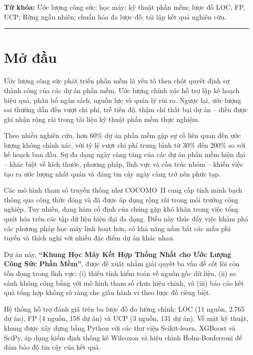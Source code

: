 \documentclass[12pt,a4paper]{article}
\begin{document}
\vspace{6pt}
\noindent\textbf{Từ khóa:} Ước lượng công sức; học máy; kỹ thuật phần mềm; lược đồ LOC, FP, UCP; Rừng ngẫu nhiên; chuẩn hóa đa lược đồ; tái lập kết quả nghiên cứu.

\vspace{4pt}
\hrule
\vspace{10pt}

\section{Mở đầu}

Ước lượng công sức phát triển phần mềm là yếu tố then chốt quyết định sự thành công của các dự án phần mềm. Ước lượng chính xác hỗ trợ lập kế hoạch hiệu quả, phân bổ ngân sách, nguồn lực và quản lý rủi ro. Ngược lại, ước lượng sai thường dẫn đến vượt chi phí, trễ tiến độ, thậm chí thất bại dự án -- điều được ghi nhận rộng rãi trong tài liệu kỹ thuật phần mềm thực nghiệm.

Theo nhiều nghiên cứu, hơn 60\% dự án phần mềm gặp sự cố liên quan đến ước lượng không chính xác, với tỷ lệ vượt chi phí trung bình từ 30\% đến 200\% so với kế hoạch ban đầu. Sự đa dạng ngày càng tăng của các dự án phần mềm hiện đại -- khác biệt về kích thước, phương pháp, lĩnh vực và cấu trúc nhóm -- khiến việc tạo ra ước lượng nhất quán và đáng tin cậy ngày càng trở nên phức tạp.

Các mô hình tham số truyền thống như COCOMO~II cung cấp tính minh bạch thông qua công thức đóng và đã được áp dụng rộng rãi trong môi trường công nghiệp. Tuy nhiên, dạng hàm cố định của chúng gặp khó khăn trong việc tổng quát hóa trên các tập dữ liệu hiện đại đa dạng. Điều này thúc đẩy việc khám phá các phương pháp học máy linh hoạt hơn, có khả năng nắm bắt các mẫu phi tuyến và thích nghi với nhiều đặc điểm dự án khác nhau.

Dự án này, \textbf{``Khung Học Máy Kết Hợp Thống Nhất cho Ước Lượng Công Sức Phần Mềm''}, được đề xuất nhằm giải quyết ba vấn đề cốt lõi còn tồn đọng trong lĩnh vực: (i) thiếu tính kiểm toán về nguồn gốc dữ liệu, (ii) so sánh không công bằng với mô hình tham số chưa hiệu chỉnh, và (iii) báo cáo kết quả tổng hợp không rõ ràng che giấu hành vi theo lược đồ riêng biệt.

Hệ thống hỗ trợ đánh giá trên ba lược đồ đo lường chính: LOC (11 nguồn, 2.765 dự án), FP (4 nguồn, 158 dự án) và UCP (3 nguồn, 131 dự án). Về mặt kỹ thuật, khung được xây dựng bằng Python với các thư viện Scikit-learn, XGBoost và SciPy, áp dụng kiểm định thống kê Wilcoxon và hiệu chỉnh Holm-Bonferroni để đảm bảo độ tin cậy của kết quả.
\end{document}
